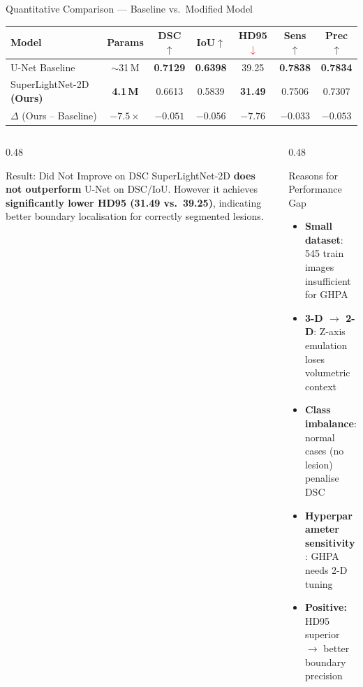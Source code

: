 \documentclass[aspectratio=169,10pt]{beamer}
\newcommand{\up}{\textcolor{accent}{$\uparrow$}}
\newcommand{\dn}{\textcolor{red}{$\downarrow$}}
\newcommand{\best}[1]{\textbf{\textcolor{accent}{#1}}}
\begin{document}
\begin{frame}{Quantitative Comparison --- Baseline vs.\ Modified Model}
  \vspace{4pt}
  \begin{center}
  \begin{tabular}{lcccccc}
    \toprule
    \textbf{Model} & \textbf{Params}
      & \textbf{DSC}\up & \textbf{IoU}\up
      & \textbf{HD95}\dn & \textbf{Sens}\up & \textbf{Prec}\up\\
    \midrule
    U-Net Baseline \cite{ronneberger2015u}
      & $\sim$31\,M & \best{0.7129} & \best{0.6398} & 39.25
      & \best{0.7838} & \best{0.7834}\\
    SuperLightNet-2D \textbf{(Ours)}
      & \best{4.1\,M} & 0.6613 & 0.5839 & \best{31.49}
      & 0.7506 & 0.7307\\
    \midrule
    $\Delta$ (Ours -- Baseline)
      & \textcolor{accent}{$-7.5\times$}
      & $-0.051$ & $-0.056$ & \textcolor{accent}{$-7.76$}
      & $-0.033$ & $-0.053$\\
    \bottomrule
  \end{tabular}
  \end{center}

  \vspace{6pt}
  \begin{columns}[T]
    \begin{column}{0.48\textwidth}
      \begin{alertblock}{Result: Did Not Improve on DSC}
        SuperLightNet-2D \textbf{does not outperform} U-Net on DSC/IoU.
        However it achieves \textbf{significantly lower HD95 (31.49 vs.\ 39.25)},
        indicating better boundary localisation for correctly segmented lesions.
      \end{alertblock}
    \end{column}
    \begin{column}{0.48\textwidth}
      \begin{block}{Reasons for Performance Gap}
        \begin{itemize}
          \item \textbf{Small dataset}: 545 train images insufficient for GHPA
          \item \textbf{3-D $\to$ 2-D}: Z-axis emulation loses volumetric context
          \item \textbf{Class imbalance}: normal cases (no lesion) penalise DSC
          \item \textbf{Hyperparameter sensitivity}: GHPA needs 2-D tuning
          \item \textbf{Positive:} HD95 superior $\to$ better boundary precision
        \end{itemize}
      \end{block}
    \end{column}
  \end{columns}
\end{frame}
\end{document}
